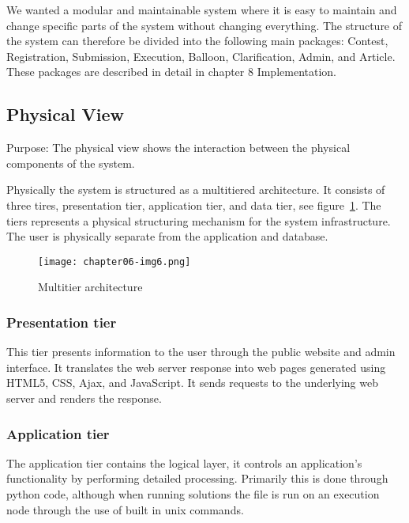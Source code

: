 \bigskip

We wanted a modular and maintainable system where it is easy to maintain
and change specific parts of the system without changing everything.
The structure of the system can therefore be divided into the following
main packages: Contest, Registration, Submission, Execution, Balloon,
Clarification, Admin, and Article. These packages are described in
detail in chapter 8 Implementation. 

\subsection{Physical View}

Purpose: \newline
The physical view shows the interaction between the physical components
of the system.

Physically the system is structured as a multitiered architecture. It
consists of three tires, presentation tier, application tier, and data
tier, see figure~\ref{fig:multitier}. The tiers represents a physical structuring
mechanism for the system infrastructure. The user is physically
separate from the application and database. 


\bigskip

\begin{figure}[h]
	\centering
	\texttt{[image: chapter06-img6.png]}
	\caption{Multitier architecture}
	\label{fig:multitier}
\end{figure}

\bigskip

\subsubsection{Presentation tier}

This tier presents information to the user through the public website
and admin interface. It translates the web server response into web
pages generated using HTML5, CSS, Ajax, and JavaScript. It sends
requests to the underlying web server and renders the response.


\bigskip

\subsubsection{Application tier}

The application tier contains the logical layer, it controls an
application{\textquoteright}s functionality by performing detailed
processing. Primarily this is done through python code, although when
running solutions the file is run on an execution node through the use
of built in unix commands. 

